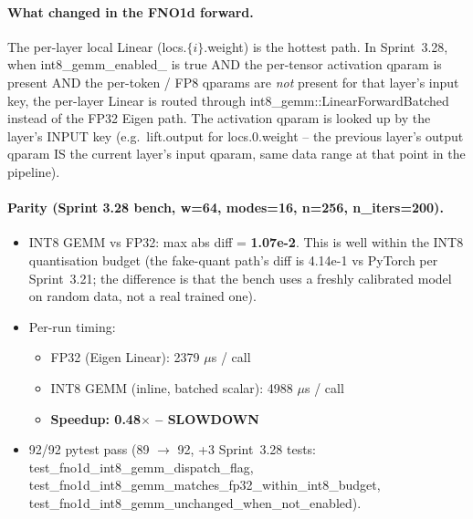 \documentclass[10pt,twocolumn]{article}
\renewcommand{\texttt}[1]{{\normalfont\ttfamily #1}\normalfont\rmfamily}
\begin{document}
\paragraph{What changed in the FNO1d forward.}
The per-layer local Linear
(\texttt{locs.$\{i\}$.weight}) is the
hottest path.  In Sprint~3.28, when
\texttt{int8\_gemm\_enabled\_} is true
AND the per-tensor activation qparam is
present AND the per-token / FP8
qparams are \emph{not} present for
that layer's input key, the per-layer
Linear is routed through
\texttt{int8\_gemm::LinearForwardBatched}
instead of the FP32 Eigen path.  The
activation qparam is looked up by the
layer's INPUT key (e.g.\ \texttt{lift.output}
for \texttt{locs.0.weight} -- the
previous layer's output qparam IS the
current layer's input qparam, same
data range at that point in the
pipeline).

\paragraph{Parity (Sprint 3.28 bench, w=64, modes=16, n=256, n\_iters=200).}
\begin{itemize}
\item INT8 GEMM vs FP32: max abs diff = \textbf{1.07e-2}.
  This is well within the INT8 quantisation
  budget (the fake-quant path's diff is
  4.14e-1 vs PyTorch per Sprint~3.21;
  the difference is that the
  \texttt{bench} uses a freshly
  calibrated model on random data, not
  a real trained one).
\item Per-run timing:
  \begin{itemize}
  \item FP32 (Eigen Linear):
    2379 $\mu$s / call
  \item INT8 GEMM (inline, batched
    scalar): 4988 $\mu$s / call
  \item \textbf{Speedup: 0.48$\times$ --
    SLOWDOWN}
  \end{itemize}
\item 92/92 pytest pass (89 $\to$ 92,
  +3 Sprint~3.28 tests:
  \texttt{test\_fno1d\_int8\_gemm\_dispatch\_flag},
  \texttt{test\_fno1d\_int8\_gemm\_matches\_fp32\_within\_int8\_budget},
  \texttt{test\_fno1d\_int8\_gemm\_unchanged\_when\_not\_enabled}).
\end{itemize}
\end{document}
